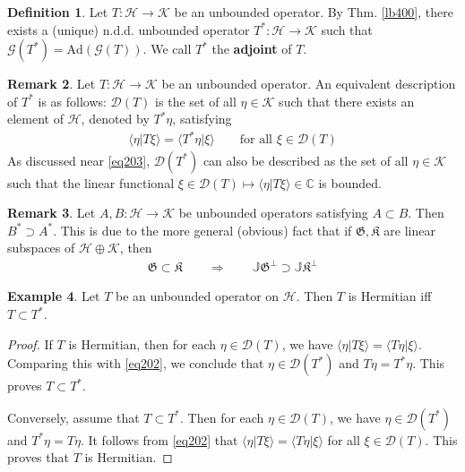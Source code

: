 \documentclass[12pt,b5paper,notitlepage]{article}
\theoremstyle{definition}
\newtheorem{df}{Definition}[subsection]
\newtheorem{eg}[df]{Example}
\newtheorem{rem}[df]{Remark}
\theoremstyle{plain}
\newcommand{\fk}{\mathfrak}
\newcommand{\Dom}{\mathscr{D}}
\newcommand{\bk}[1]{\langle {#1}\rangle}
\newcommand{\Ad}{\mathrm{Ad}}
\newcommand{\Cbb}{\mathbb C}
\newcommand{\Jbb}{\mathbb J}
\newcommand{\MH}{\mathcal H}
\newcommand{\MK}{\mathcal K}
\newcommand{\SG}{\mathscr G}
\numberwithin{equation}{section}
\begin{document}
\begin{df}
Let $T:\MH\rightarrow\MK$ be an unbounded operator. By Thm. \ref{lb400}, there exists a (unique) n.d.d. unbounded operator $T^*:\MH\rightarrow\MK$ such that $\SG(T^*)=\Ad(\SG(T))$. We call $T^*$ the \textbf{adjoint}  of $T$.
\end{df}

\begin{rem}
Let $T:\MH\rightarrow\MK$ be an unbounded operator. An equivalent description of $T^*$ is as follows: $\Dom(T)$ is the set of all $\eta\in\MK$ such that there exists an element of $\MH$, denoted by $T^*\eta$, satisfying
\begin{align}\label{eq202}
\bk{\eta|T\xi}=\bk{T^*\eta|\xi}\qquad\text{for all }\xi\in\Dom(T)
\end{align}
As discussed near \eqref{eq203}, $\Dom(T^*)$ can also be described as the set of all $\eta\in\MK$ such that the linear functional $\xi\in\Dom(T)\mapsto\bk{\eta|T\xi}\in\Cbb$ is bounded.
\end{rem}


\begin{rem}
Let $A,B:\MH\rightarrow\MK$ be unbounded operators satisfying $A\subset B$. Then $B^*\supset A^*$. This is due to the more general (obvious) fact that if $\fk G,\fk K$ are linear subspaces of $\MH\oplus\MK$, then
\begin{align*}
\fk G\subset\fk K\qquad\Longrightarrow\qquad\Jbb\fk G^\perp\supset\Jbb\fk K^\perp
\end{align*}
\end{rem}



\begin{eg}\label{lb409}
Let $T$ be an unbounded operator on $\MH$. Then $T$ is Hermitian iff $T\subset T^*$.
\end{eg}


\begin{proof}
If $T$ is Hermitian, then for each $\eta\in\Dom(T)$, we have $\bk{\eta|T\xi}=\bk{T\eta|\xi}$. Comparing this with \eqref{eq202}, we conclude that $\eta\in\Dom(T^*)$ and $T\eta=T^*\eta$. This proves $T\subset T^*$. 

Conversely, assume that $T\subset T^*$. Then for each $\eta\in\Dom(T)$, we have $\eta\in\Dom(T^*)$ and $T^*\eta=T\eta$. It follows from \eqref{eq202} that $\bk{\eta|T\xi}=\bk{T\eta|\xi}$ for all $\xi\in\Dom(T)$. This proves that $T$ is Hermitian.
\end{proof}
\end{document}
